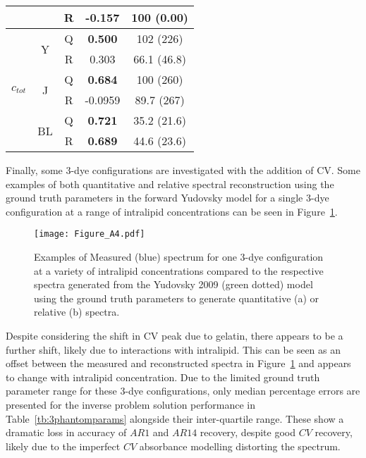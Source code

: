 \begin{table}[htbp]
\begin{tabular}{|ccc|cc|}
        & & R & -0.157 & 100 (0.00) \\
        \hline
        \multirow{6}{*}{$c_{tot}$} & \multirow{2}{*}{Y} & Q &  \textbf{0.500} & 102 (226) \\
        & & R & 0.303 & 66.1 (46.8) \\
        \cline{2-5}
        & \multirow{2}{*}{J} & Q & \textbf{0.684} & 100 (260) \\
        & & R & -0.0959 & 89.7 (267)\\
        \cline{2-5}
        & \multirow{2}{*}{BL} & Q & \textbf{0.721} & 35.2 (21.6) \\
        & & R & \textbf{0.689} & 44.6 (23.6)\\
        \hline
    \end{tabular}
    \label{tb:phantomparams}
\end{table}

Finally, some 3-dye configurations are investigated with the addition of CV. Some examples of both quantitative and relative spectral reconstruction using the ground truth parameters in the forward Yudovsky model for a single 3-dye configuration at a range of intralipid concentrations can be seen in Figure~\ref{ap:3phantomforwards}. 

\begin{figure}[htb!]
    \centering {}
    \texttt{[image: Figure\_A4.pdf]}
    \caption{Examples of Measured (blue) spectrum for one 3-dye configuration at a variety of intralipid concentrations compared to the respective spectra generated from the Yudovsky 2009 (green dotted) model using the ground truth parameters to generate quantitative (a) or relative (b) spectra.}
 \label{ap:3phantomforwards}
\end{figure}

Despite considering the shift in CV peak due to gelatin, there appears to be a further shift, likely due to interactions with intralipid. This can be seen as an offset between the measured and reconstructed spectra in Figure~\ref{ap:3phantomforwards} and appears to change with intralipid concentration. Due to the limited ground truth parameter range for these 3-dye configurations, only median percentage errors are presented for the inverse problem solution performance in Table~\ref{tb:3phantomparams} alongside their inter-quartile range. These show a dramatic loss in accuracy of $AR1$ and $AR14$ recovery, despite good $CV$ recovery, likely due to the imperfect $CV$ absorbance modelling distorting the spectrum. 

